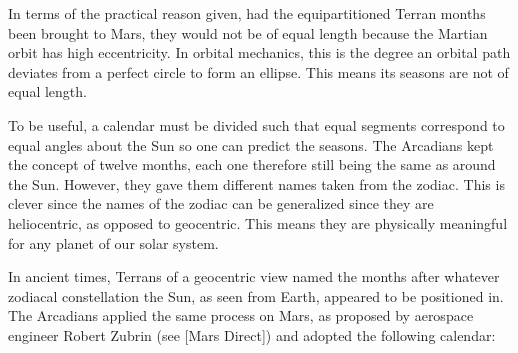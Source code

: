 In terms of the practical reason given, had the equipartitioned Terran months been brought to Mars, they would not be of equal length because the Martian orbit has high eccentricity. In orbital mechanics, this is the degree an orbital path deviates from a perfect circle to form an ellipse. This means its seasons are not of equal length. 

To be useful, a calendar must be divided such that equal segments correspond to equal angles about the Sun so one can predict the seasons. The Arcadians kept the concept of twelve months, each one therefore still being the same as  around the Sun. However, they gave them different names taken from the zodiac. This is clever since the names of the zodiac can be generalized since they are heliocentric, as opposed to geocentric. This means they are physically meaningful for any planet of our solar system. 

In ancient times, Terrans of a geocentric view named the months after whatever zodiacal constellation the Sun, as seen from Earth, appeared to be positioned in. The Arcadians applied the same process on Mars, as proposed by aerospace engineer Robert Zubrin (see [Mars Direct]) and adopted the following calendar:
\crlf


